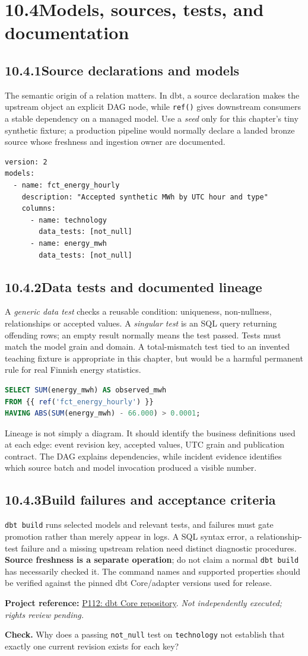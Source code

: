 \documentclass[11pt,twoside]{article}
\newcommand{\topic}[2]{\subsection*{#1\quad #2}}
\newcommand{\repo}[2]{\par\begingroup\fontsize{8.0}{9.6}\selectfont\sffamily\color{inkgray}\textbf{Project reference:} \href{#2}{#1}. \textit{Not independently executed; rights review pending.}\par\endgroup}
\begin{document}
\section*{10.4\quad Models, sources, tests, and documentation}
\topic{10.4.1}{Source declarations and models}
The semantic origin of a relation matters. In dbt, a source declaration makes the upstream object an explicit DAG node, while \texttt{ref()} gives downstream consumers a stable dependency on a managed model. Use a \emph{seed} only for this chapter's tiny synthetic fixture; a production pipeline would normally declare a landed bronze source whose freshness and ingestion owner are documented.
\begin{lstlisting}[caption={Selected YAML model properties; dbt Core-style syntax.}]
version: 2
models:
  - name: fct_energy_hourly
    description: "Accepted synthetic MWh by UTC hour and type"
    columns:
      - name: technology
        data_tests: [not_null]
      - name: energy_mwh
        data_tests: [not_null]
\end{lstlisting}
\topic{10.4.2}{Data tests and documented lineage}
A \emph{generic data test} checks a reusable condition: uniqueness, non-nullness, relationships or accepted values. A \emph{singular test} is an SQL query returning offending rows; an empty result normally means the test passed. Tests must match the model grain and domain. A total-mismatch test tied to an invented teaching fixture is appropriate in this chapter, but would be a harmful permanent rule for real Finnish energy statistics.
\begin{lstlisting}[language=SQL,caption={A fixture-only dbt singular test; zero rows means pass.}]
SELECT SUM(energy_mwh) AS observed_mwh
FROM {{ ref('fct_energy_hourly') }}
HAVING ABS(SUM(energy_mwh) - 66.000) > 0.0001;
\end{lstlisting}
Lineage is not simply a diagram. It should identify the business definitions used at each edge: event revision key, accepted values, UTC grain and publication contract. The DAG explains dependencies, while incident evidence identifies which source batch and model invocation produced a visible number.
\topic{10.4.3}{Build failures and acceptance criteria}
\texttt{dbt build} runs selected models and relevant tests, and failures must gate promotion rather than merely appear in logs. A SQL syntax error, a relationship-test failure and a missing upstream relation need distinct diagnostic procedures. \textbf{Source freshness is a separate operation}; do not claim a normal \texttt{dbt build} has necessarily checked it. The command names and supported properties should be verified against the pinned dbt Core/adapter versions used for release.
\repo{P112: dbt Core repository}{https://github.com/dbt-labs/dbt-core}
\textbf{Check.} Why does a passing \texttt{not\_null} test on \texttt{technology} not establish that exactly one current revision exists for each key?
\newpage
\end{document}
